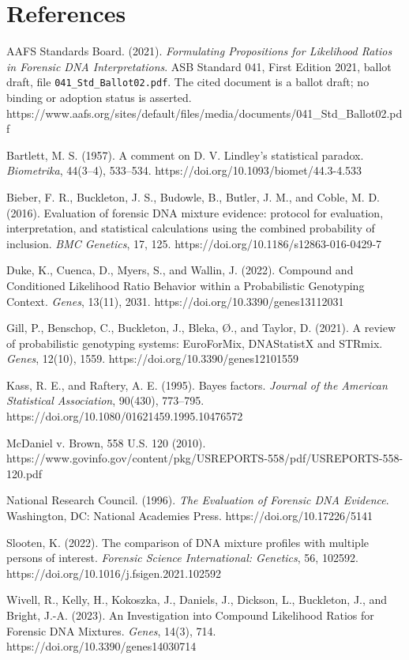 \documentclass[
]{article}
\begin{document}
\section{References}\label{references}

AAFS Standards Board. (2021). \emph{Formulating Propositions for
Likelihood Ratios in Forensic DNA Interpretations}. ASB Standard 041,
First Edition 2021, ballot draft, file \texttt{041\_Std\_Ballot02.pdf}.
The cited document is a ballot draft; no binding or adoption status is
asserted.
https://www.aafs.org/sites/default/files/media/documents/041\_Std\_Ballot02.pdf

Bartlett, M. S. (1957). A comment on D. V. Lindley's statistical
paradox. \emph{Biometrika}, 44(3--4), 533--534.
https://doi.org/10.1093/biomet/44.3-4.533

Bieber, F. R., Buckleton, J. S., Budowle, B., Butler, J. M., and Coble,
M. D. (2016). Evaluation of forensic DNA mixture evidence: protocol for
evaluation, interpretation, and statistical calculations using the
combined probability of inclusion. \emph{BMC Genetics}, 17, 125.
https://doi.org/10.1186/s12863-016-0429-7

Duke, K., Cuenca, D., Myers, S., and Wallin, J. (2022). Compound and
Conditioned Likelihood Ratio Behavior within a Probabilistic Genotyping
Context. \emph{Genes}, 13(11), 2031.
https://doi.org/10.3390/genes13112031

Gill, P., Benschop, C., Buckleton, J., Bleka, Ø., and Taylor, D. (2021).
A review of probabilistic genotyping systems: EuroForMix, DNAStatistX
and STRmix. \emph{Genes}, 12(10), 1559.
https://doi.org/10.3390/genes12101559

Kass, R. E., and Raftery, A. E. (1995). Bayes factors. \emph{Journal of
the American Statistical Association}, 90(430), 773--795.
https://doi.org/10.1080/01621459.1995.10476572

McDaniel v. Brown, 558 U.S. 120 (2010).
https://www.govinfo.gov/content/pkg/USREPORTS-558/pdf/USREPORTS-558-120.pdf

National Research Council. (1996). \emph{The Evaluation of Forensic DNA
Evidence}. Washington, DC: National Academies Press.
https://doi.org/10.17226/5141

Slooten, K. (2022). The comparison of DNA mixture profiles with multiple
persons of interest. \emph{Forensic Science International: Genetics},
56, 102592. https://doi.org/10.1016/j.fsigen.2021.102592

Wivell, R., Kelly, H., Kokoszka, J., Daniels, J., Dickson, L.,
Buckleton, J., and Bright, J.-A. (2023). An Investigation into Compound
Likelihood Ratios for Forensic DNA Mixtures. \emph{Genes}, 14(3), 714.
https://doi.org/10.3390/genes14030714
\end{document}
